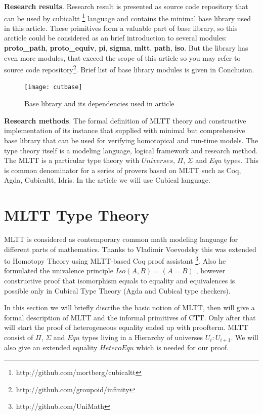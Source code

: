 \documentclass{svproc}
\begin{document}
{\bf Research results}. Research result is presented as source code repository that can be used by
cubicaltt \footnote{http://github.com/mortberg/cubicaltt} language and contains the minimal base library used in this article.
These primitives form a valuable part of base library, so this arcticle could be
considered as an brief introduction to several modules: {\bf proto\_path}, {\bf proto\_equiv}, {\bf pi},
{\bf sigma}, {\bf mltt}, {\bf path}, {\bf iso}. But the library has even more modules, that
exceed the scope of this article so you may refer to source code
repository\footnote{http://github.com/groupoid/infinity}. Brief list of base library modules is given
in Conclusion.

\begin{figure}[h]
  \centerline{\texttt{[image: cutbase]}}
  \caption{Base library and its dependencies used in article}
\end{figure}

{\bf Research methods}. The formal definition of MLTT theory and constructive
implementation of its instance that supplied with minimal but comprehensive base library that
can be used for verifying homotopical and run-time models. The type theory itself is a modeling
language, logical framework and research method. The MLTT is a particular type theory with
$Universes$, $\Pi$, $\Sigma$ and $Equ$ types. This is common denominator for a series of provers
based on MLTT such as Coq, Agda, Cubicaltt, Idris. In the article we will use Cubical language.

\section{MLTT Type Theory}

MLTT is considered as contemporary common math modeling language for different parts of mathematics.
Thanks to Vladimir Voevodsky this was extended to Homotopy Theory
using MLTT-based Coq proof assistant \footnote{http://github.com/UniMath}.
Also he formulated the univalence principle $Iso(A,B)=(A=B)$ \cite{HoTT},
however constructive proof that isomorphism equals to equality and equivalences is possible only
in Cubical Type Theory \cite{Mortberg17} (Agda and Cubical type checkers).

In this section we will briefly discribe the basic notion of MLTT, then will give a formal
description of MLTT and the informal primitives of CTT. Only after that will start
the proof of heterogeneous equality ended up with proofterm. MLTT consist of
$\Pi$, $\Sigma$ and $Equ$ types living in a Hierarchy of universes $U_i : U_{i+1}$. We will
also give an extended equality $HeteroEqu$ which is needed for our proof.
\end{document}
